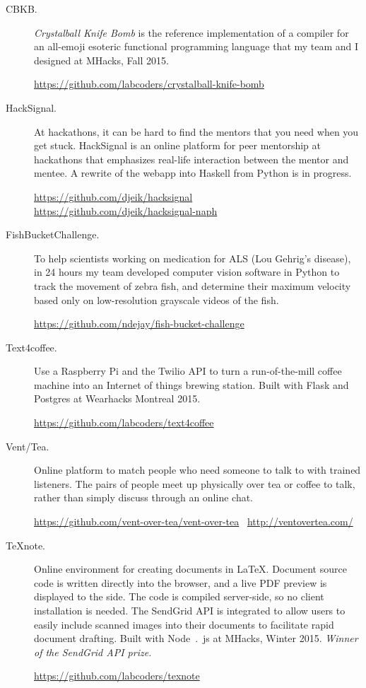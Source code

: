 \documentclass{article}
\begin{document}
\begin{description}
    \item[CBKB.] \emph{Crystalball Knife Bomb} is the reference implementation
        of a compiler for an all-emoji esoteric functional programming language
        that my team and I designed at MHacks, Fall 2015.

        \url{https://github.com/labcoders/crystalball-knife-bomb}

    \item[HackSignal.] At hackathons, it can be hard to find the mentors that
        you need when you get stuck. HackSignal is an online platform for peer
        mentorship at hackathons that emphasizes real-life interaction between
        the mentor and mentee. A rewrite of the webapp into Haskell from Python
        is in progress.

        \url{https://github.com/djeik/hacksignal}~
        \url{https://github.com/djeik/hacksignal-naph}

    \item[FishBucketChallenge.] To help scientists working on medication for
        ALS (Lou Gehrig's disease), in 24 hours my team developed computer
        vision software in Python to track the movement of zebra fish, and
        determine their maximum velocity based only on low-resolution grayscale
        videos of the fish.

        \url{https://github.com/ndejay/fish-bucket-challenge}

    \item[Text4coffee.] Use a Raspberry Pi and the Twilio API to turn a
        run-of-the-mill coffee machine into an Internet of things brewing
        station. Built with Flask and Postgres at Wearhacks Montreal 2015.

        \url{https://github.com/labcoders/text4coffee}

    \item[Vent/Tea.] Online platform to match people who need someone to talk
        to with trained listeners. The pairs of people meet up physically over
        tea or coffee to talk, rather than simply discuss through an online
        chat.

        \url{https://github.com/vent-over-tea/vent-over-tea}~
        \url{http://ventovertea.com/}

    \item[TeXnote.] Online environment for creating documents in \LaTeX.
        Document source code is written directly into the browser, and a live
        PDF preview is displayed to the side. The code is compiled server-side,
        so no client installation is needed. The SendGrid API is integrated to
        allow users to easily include scanned images into their documents to
        facilitate rapid document drafting. Built with Node~.~js at MHacks,
        Winter 2015.
        \emph{Winner of the SendGrid API prize.}

        \url{https://github.com/labcoders/texnote}
\end{description}
\end{document}
